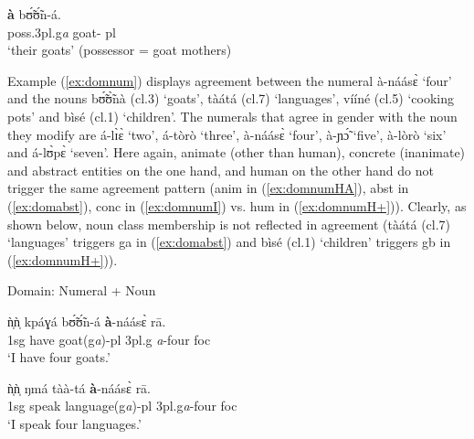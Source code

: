\begin{exe}
\begin{exe}
\begin{exe}
{\begin{exe}
\begin{exe}
\begin{exe}
\begin{exe}
\begin{exe}
\begin{exe}
\begin{exe}
\begin{exe}
\begin{exe}
\begin{exe}
\begin{exe}
\begin{exe}
\begin{exe}
\begin{exe}
\begin{exe}
\begin{exe}
\begin{exe}
\begin{exe}
\begin{exe}
\ex\label{ex:dompossH-}

\gll  \textbf{à}   bʊ̃́ʊ̃́n-á.\\
   {\sc poss.3pl.g}{\it a} {goat-{\sc
pl}}\\
\glt `their goats' (possessor = goat mothers) 





\z 
 \z
 

Example (\ref{ex:domnum}) displays agreement between the numeral
{\sls à-náásɛ̀} `four' and the nouns  {\sls bʊ̃́ʊ̃̀nà}
({\sc cl.3}) `goats',  {\sls tàátá} ({\sc cl.7})
`languages',  {\sls vííné} ({\sc cl.5}) `cooking
pots' and  {\sls bìsé} ({\sc cl.1}) `children'. The  numerals that agree
in gender with the noun they
modify are  {\sls á-lɪ̀ɛ̀} `two',
 {\sls á-tòrò} `three',  {\sls à-náásɛ̀}
`four',  {\sls à-ɲɔ̃́} `five',
 {\sls à-lòrò} `six' and  {\sls á-lʊ̀pɛ̀}
`seven'. Here again, animate (other than human), concrete (inanimate) and
abstract entities on the one hand, and human on the other hand do not
trigger the same agreement pattern ({\sc anim} in (\ref{ex:domnumHA}),
 {\sc abst} in  (\ref{ex:domabst}),   {\sc conc} in (\ref{ex:domnumI})  vs. 
{\sc hum} in  (\ref{ex:domnumH+})). Clearly, as shown below, noun
class membership is not reflected in agreement ({\sls tàátá} ({\sc cl.7})
`languages' triggers {\sc g}a in (\ref{ex:domabst}) and 
 {\sls bìsé} ({\sc cl.1}) `children' triggers {\sc g}b in 
(\ref{ex:domnumH+})).


\ea\label{ex:domnum}{\rm Domain: Numeral + Noun}\\


\ea\label{ex:domnumHA}

\gll  ǹ̩ǹ̩  kpáɣá  bʊ̃́ʊ̃́n-á  \textbf{à}-náásɛ̀ rā.\\
    {\sc 1sg}  {have}  {goat({\sc g}{\it a})-{\sc pl}}  {{\sc 3pl.g}{\it
a}-four} {\sc foc}\\
\glt `I have four goats.'\\

\ex\label{ex:domabst}

\gll   ǹ̩ǹ̩  ŋmá  tàà-tá \textbf{à}-náásɛ̀ rā.\\
  {\sc 1sg}  {speak}  {language({\sc g}{\it a})-{\sc pl}}   {{\sc
3pl.g}{\it a}-four} {\sc foc}\\
\glt `I speak four languages.'\\




\end{exe}
\end{exe}
\end{exe}
\end{exe}
\end{exe}
\end{exe}
\end{exe}
\end{exe}
\end{exe}
\end{exe}
\end{exe}
\end{exe}
\end{exe}
\end{exe}
\end{exe}
\end{exe}
\end{exe}
\end{exe}
\end{exe}}
\end{exe}
\end{exe}
\end{exe}

